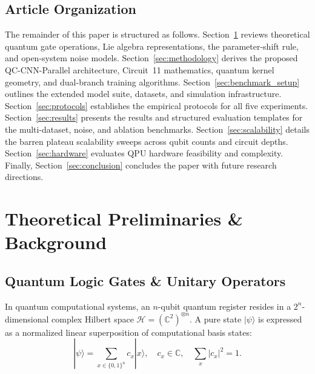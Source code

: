 \documentclass[pdflatex,sn-mathphys-num]{sn-jnl}%
\theoremstyle{thmstyleone}%
\theoremstyle{thmstyletwo}%
\theoremstyle{thmstylethree}%
\begin{document}
\subsection{Article Organization}
The remainder of this paper is structured as follows. Section~\ref{sec:preliminaries} reviews theoretical quantum gate operations, Lie algebra representations, the parameter-shift rule, and open-system noise models. Section~\ref{sec:methodology} derives the proposed QC-CNN-Parallel architecture, Circuit~11 mathematics, quantum kernel geometry, and dual-branch training algorithms. Section~\ref{sec:benchmark_setup} outlines the extended model suite, datasets, and simulation infrastructure. Section~\ref{sec:protocols} establishes the empirical protocols for all five experiments. Section~\ref{sec:results} presents the results and structured evaluation templates for the multi-dataset, noise, and ablation benchmarks. Section~\ref{sec:scalability} details the barren plateau scalability sweeps across qubit counts and circuit depths. Section~\ref{sec:hardware} evaluates QPU hardware feasibility and complexity. Finally, Section~\ref{sec:conclusion} concludes the paper with future research directions.

\section{Theoretical Preliminaries \& Background}
\label{sec:preliminaries}

\subsection{Quantum Logic Gates \& Unitary Operators}
In quantum computational systems, an $n$-qubit quantum register resides in a $2^n$-dimensional complex Hilbert space $\mathcal{H} = (\mathbb{C}^2)^{\otimes n}$. A pure state $|\psi\rangle$ is expressed as a normalized linear superposition of computational basis states:
\begin{equation}
|\psi\rangle = \sum_{x \in \{0,1\}^n} c_x |x\rangle, \quad c_x \in \mathbb{C}, \quad \sum_{x} |c_x|^2 = 1.
\label{eq:state_superposition}
\end{equation}
\end{document}
